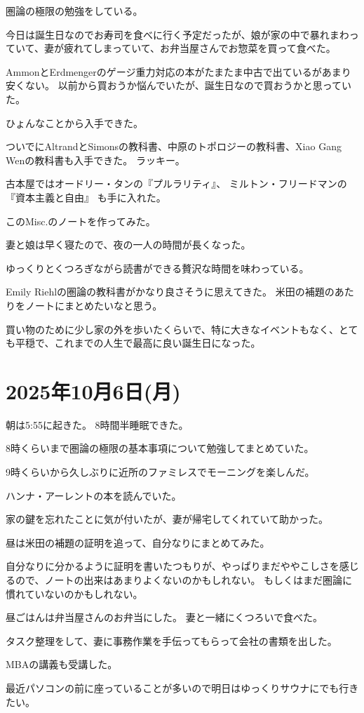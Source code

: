 \documentclass[uplatex]{jsarticle}
\begin{document}
圏論の極限の勉強をしている。

今日は誕生日なのでお寿司を食べに行く予定だったが、娘が家の中で暴れまわっていて、妻が疲れてしまっていて、お弁当屋さんでお惣菜を買って食べた。

AmmonとErdmengerのゲージ重力対応の本がたまたま中古で出ているがあまり安くない。
以前から買おうか悩んでいたが、誕生日なので買おうかと思っていた。

ひょんなことから入手できた。

ついでにAltrandとSimonsの教科書、中原のトポロジーの教科書、Xiao Gang Wenの教科書も入手できた。
ラッキー。

古本屋ではオードリー・タンの『プルラリティ』、
ミルトン・フリードマンの『資本主義と自由』
も手に入れた。

このMisc.のノートを作ってみた。

妻と娘は早く寝たので、夜の一人の時間が長くなった。

ゆっくりとくつろぎながら読書ができる贅沢な時間を味わっている。

Emily Riehlの圏論の教科書がかなり良さそうに思えてきた。
米田の補題のあたりをノートにまとめたいなと思う。

買い物のために少し家の外を歩いたくらいで、特に大きなイベントもなく、とても平穏で、これまでの人生で最高に良い誕生日になった。

\section{2025年10月6日(月)} 

朝は5:55に起きた。
8時間半睡眠できた。

8時くらいまで圏論の極限の基本事項について勉強してまとめていた。

9時くらいから久しぶりに近所のファミレスでモーニングを楽しんだ。

ハンナ・アーレントの本を読んでいた。

家の鍵を忘れたことに気が付いたが、妻が帰宅してくれていて助かった。

昼は米田の補題の証明を追って、自分なりにまとめてみた。

自分なりに分かるように証明を書いたつもりが、やっぱりまだややこしさを感じるので、ノートの出来はあまりよくないのかもしれない。
もしくはまだ圏論に慣れていないのかもしれない。

昼ごはんは弁当屋さんのお弁当にした。
妻と一緒にくつろいで食べた。

タスク整理をして、妻に事務作業を手伝ってもらって会社の書類を出した。

MBAの講義も受講した。

最近パソコンの前に座っていることが多いので明日はゆっくりサウナにでも行きたい。
\end{document}

